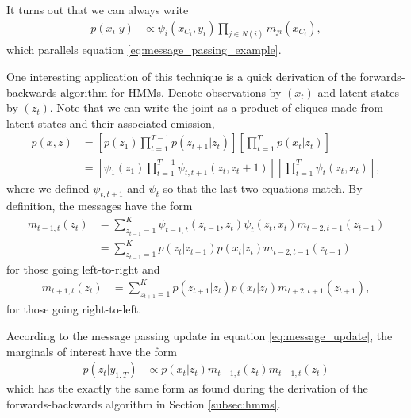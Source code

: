 \documentclass[14pt]{extarticle}
\begin{document}
It turns out that we can always write
\begin{align}
  \label{eq:message_update}
  p\left(x_{i} \vert y\right) &\propto \psi_{i}\left(x_{C_i}, y_i\right) \prod_{j \in N\left(i\right)} m_{ji}\left(x_{C_i}\right),
\end{align}
which parallels equation \ref{eq:message_passing_example}.

One interesting application of this technique is a quick derivation of the
forwards-backwards algorithm for HMMs. Denote observations by $\left(x_t\right)$
and latent states by $\left(z_t\right)$. Note that we can write the joint as a
product of cliques made from latent states and their associated emission,
\begin{align*}
  p\left(x, z\right) &= \left[p\left(z_1\right) \prod_{t = 1}^{T - 1} p\left(z_{t + 1} \vert z_t\right)\right]
  \left[\prod_{t = 1}^{T} p\left(x_t \vert z_t\right)\right] \\
    &= \left[\psi_1\left(z_1\right)\prod_{t = 1}^{T - 1} \psi_{t, t + 1}\left(z_t, z_t +
    1\right)\right] \left[\prod_{t = 1}^{T} \psi_t\left(z_t, x_t\right)\right],
\end{align*}
where we defined $\psi_{t, t + 1}$ and $\psi_t$ so that the last two equations
match. By definition, the messages have the form
\begin{align*}
  m_{t - 1, t}\left(z_{t}\right) &= \sum_{z_{t - 1} = 1}^{K} \psi_{t - 1, t}\left(z_{t - 1}, z_t\right) \psi_{t}\left(z_t, x_t\right) m_{t - 2, t - 1}\left(z_{t - 1}\right) \\
  &= \sum_{z_{t - 1} = 1}^{K} p\left(z_t \vert z_{t - 1}\right)p\left(x_t \vert z_t\right)m_{t - 2, t - 1}\left(z_{t - 1}\right)
\end{align*}
for those going left-to-right and
\begin{align*}
  m_{t + 1, t}\left(z_t\right) &= \sum_{z_{t + 1} = 1}^{K} p\left(z_{t + 1}\vert z_t\right)p\left(x_t \vert z_t\right)m_{t + 2, t + 1}\left(z_{t + 1}\right),
\end{align*}
for those going right-to-left.

According to the message passing update in equation \ref{eq:message_update}, the
marginals of interest have the form
\begin{align*}
  p\left(z_{t} \vert y_{1:T}\right) &\propto p\left(x_t \vert z_t\right) m_{t - 1, t}\left(z_t\right)m_{t + 1, t}\left(z_t\right)
\end{align*}
which has the exactly the same form as found during the derivation of the
forwards-backwards algorithm in Section \ref{subsec:hmms}.
\end{document}
